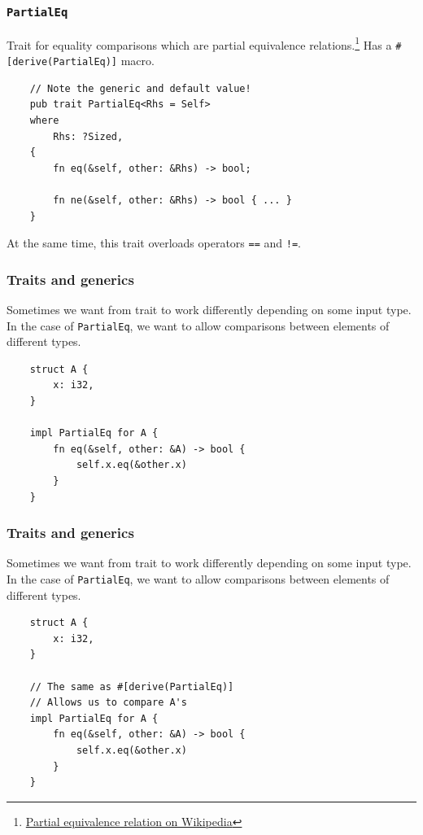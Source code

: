 \documentclass[aspectratio=1610,t]{beamer}
\begin{document}

\begin{frame}[fragile]
\frametitle{\texttt{PartialEq}}
Trait for equality comparisons which are partial equivalence relations.\footnote{\href{https://en.wikipedia.org/wiki/Partial_equivalence_relation}{Partial equivalence relation on Wikipedia}} Has a \texttt{\#[derive(PartialEq)]} macro.

\begin{verbatim}
    // Note the generic and default value!
    pub trait PartialEq<Rhs = Self>
    where
        Rhs: ?Sized,
    {
        fn eq(&self, other: &Rhs) -> bool;

        fn ne(&self, other: &Rhs) -> bool { ... }
    }
\end{verbatim}

At the same time, this trait overloads operators \texttt{==} and \texttt{!=}.
\end{frame}


\begin{frame}[fragile]
\frametitle{Traits and generics}
Sometimes we want from trait to work differently depending on some input type. In the case of \texttt{PartialEq}, we want to allow comparisons between elements of different types.

\begin{verbatim}
    struct A {
        x: i32,
    }

    impl PartialEq for A {
        fn eq(&self, other: &A) -> bool {
            self.x.eq(&other.x)
        }
    }
\end{verbatim}
\end{frame}


\begin{frame}[fragile]
\frametitle{Traits and generics}
Sometimes we want from trait to work differently depending on some input type. In the case of \texttt{PartialEq}, we want to allow comparisons between elements of different types.

\begin{verbatim}
    struct A {
        x: i32,
    }

    // The same as #[derive(PartialEq)]
    // Allows us to compare A's
    impl PartialEq for A {
        fn eq(&self, other: &A) -> bool {
            self.x.eq(&other.x)
        }
    }
\end{verbatim}
\end{frame}
\end{document}
